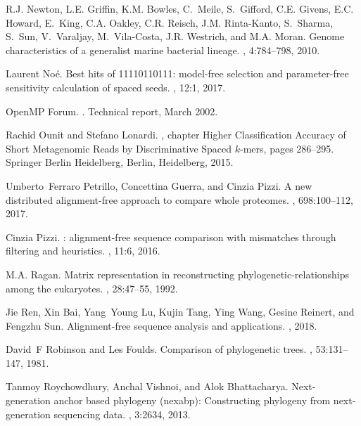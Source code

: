 \documentclass[review]{elsarticle}
\begin{document}
{\begin{thebibliography}{10}
R.J. Newton, L.E. Griffin, K.M. Bowles, C.~Meile, S.~Gifford, C.E. Givens, E.C.
  Howard, E.~King, C.A. Oakley, C.R. Reisch, J.M. Rinta-Kanto, S.~Sharma,
  S.~Sun, V.~Varaljay, M.~Vila-Costa, J.R. Westrich, and M.A. Moran.
\newblock Genome characteristics of a generalist marine bacterial lineage.
, 4:784--798, 2010.

Laurent No{\'e}.
\newblock Best hits of 11110110111: model-free selection and parameter-free
  sensitivity calculation of spaced seeds.
, 12:1, 2017.

{OpenMP Forum}.
.
\newblock Technical report, March 2002.

Rachid Ounit and Stefano Lonardi.
, chapter Higher
  Classification Accuracy of Short Metagenomic Reads by Discriminative Spaced
  $k$-mers, pages 286--295.
\newblock Springer Berlin Heidelberg, Berlin, Heidelberg, 2015.

Umberto~Ferraro Petrillo, Concettina Guerra, and Cinzia Pizzi.
\newblock A new distributed alignment-free approach to compare whole proteomes.
, 698:100--112, 2017.

Cinzia Pizzi.
: alignment-free sequence comparison with mismatches through
  filtering and heuristics.
, 11:6, 2016.

M.A. Ragan.
\newblock Matrix representation in reconstructing phylogenetic-relationships
  among the eukaryotes.
, 28:47--55, 1992.

Jie Ren, Xin Bai, Yang~Young Lu, Kujin Tang, Ying Wang, Gesine Reinert, and
  Fengzhu Sun.
\newblock Alignment-free sequence analysis and applications.
, 2018.

David~F Robinson and Les Foulds.
\newblock Comparison of phylogenetic trees.
, 53:131--147, 1981.

Tanmoy Roychowdhury, Anchal Vishnoi, and Alok Bhattacharya.
\newblock Next-generation anchor based phylogeny (nexabp): Constructing
  phylogeny from next-generation sequencing data.
, 3:2634, 2013.


\end{thebibliography}}
\end{document}
